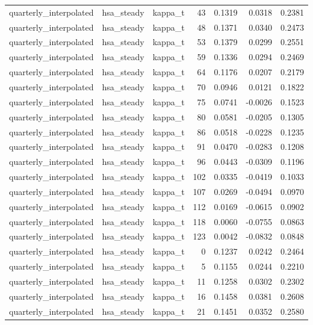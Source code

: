 \begin{tabular}{lllrrrr}
quarterly\_interpolated & hsa\_steady & kappa\_t & 43 & 0.1319 & 0.0318 & 0.2381 \\
quarterly\_interpolated & hsa\_steady & kappa\_t & 48 & 0.1371 & 0.0340 & 0.2473 \\
quarterly\_interpolated & hsa\_steady & kappa\_t & 53 & 0.1379 & 0.0299 & 0.2551 \\
quarterly\_interpolated & hsa\_steady & kappa\_t & 59 & 0.1336 & 0.0294 & 0.2469 \\
quarterly\_interpolated & hsa\_steady & kappa\_t & 64 & 0.1176 & 0.0207 & 0.2179 \\
quarterly\_interpolated & hsa\_steady & kappa\_t & 70 & 0.0946 & 0.0121 & 0.1822 \\
quarterly\_interpolated & hsa\_steady & kappa\_t & 75 & 0.0741 & -0.0026 & 0.1523 \\
quarterly\_interpolated & hsa\_steady & kappa\_t & 80 & 0.0581 & -0.0205 & 0.1305 \\
quarterly\_interpolated & hsa\_steady & kappa\_t & 86 & 0.0518 & -0.0228 & 0.1235 \\
quarterly\_interpolated & hsa\_steady & kappa\_t & 91 & 0.0470 & -0.0283 & 0.1208 \\
quarterly\_interpolated & hsa\_steady & kappa\_t & 96 & 0.0443 & -0.0309 & 0.1196 \\
quarterly\_interpolated & hsa\_steady & kappa\_t & 102 & 0.0335 & -0.0419 & 0.1033 \\
quarterly\_interpolated & hsa\_steady & kappa\_t & 107 & 0.0269 & -0.0494 & 0.0970 \\
quarterly\_interpolated & hsa\_steady & kappa\_t & 112 & 0.0169 & -0.0615 & 0.0902 \\
quarterly\_interpolated & hsa\_steady & kappa\_t & 118 & 0.0060 & -0.0755 & 0.0863 \\
quarterly\_interpolated & hsa\_steady & kappa\_t & 123 & 0.0042 & -0.0832 & 0.0848 \\
quarterly\_interpolated & hsa\_steady & kappa\_t & 0 & 0.1237 & 0.0242 & 0.2464 \\
quarterly\_interpolated & hsa\_steady & kappa\_t & 5 & 0.1155 & 0.0244 & 0.2210 \\
quarterly\_interpolated & hsa\_steady & kappa\_t & 11 & 0.1258 & 0.0302 & 0.2302 \\
quarterly\_interpolated & hsa\_steady & kappa\_t & 16 & 0.1458 & 0.0381 & 0.2608 \\
quarterly\_interpolated & hsa\_steady & kappa\_t & 21 & 0.1451 & 0.0352 & 0.2580 \\

\end{tabular}
